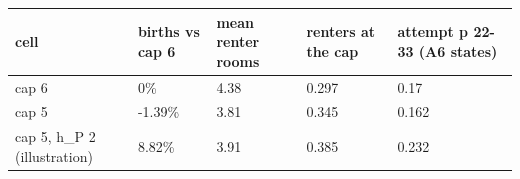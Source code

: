 \begingroup\small
\setlength{\tabcolsep}{3pt}
\renewcommand{\arraystretch}{1.04}
\begin{tabularx}{\linewidth}{XXXXX}
\toprule
cell & births vs cap 6 & mean renter rooms & renters at the cap & attempt p 22-33 (A6 states) \\
\midrule
cap 6 & 0\% & 4.38 & 0.297 & 0.17 \\
cap 5 & -1.39\% & 3.81 & 0.345 & 0.162 \\
cap 5, h\_P 2 (illustration) & 8.82\% & 3.91 & 0.385 & 0.232 \\
\bottomrule
\end{tabularx}
\endgroup
